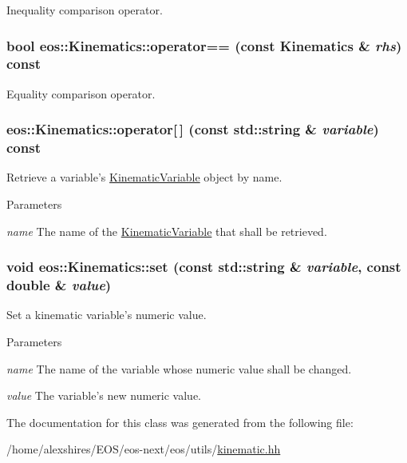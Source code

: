 Inequality comparison operator. \hypertarget{classeos_1_1Kinematics_a7c2edc2b99e1cfd20b71ebd3dcc64d6f}{
\subsubsection[{operator==}]{\setlength{\rightskip}{0pt plus 5cm}bool eos::Kinematics::operator== (const {\bf Kinematics} \& {\em rhs}) const}}
\label{classeos_1_1Kinematics_a7c2edc2b99e1cfd20b71ebd3dcc64d6f}


Equality comparison operator. \hypertarget{classeos_1_1Kinematics_acb41cb59e57011e701785db06164343c}{
\subsubsection[{operator[]}]{ eos::Kinematics::operator\mbox{[}$\,$\mbox{]} (const std::string \& {\em variable}) const}}
\label{classeos_1_1Kinematics_acb41cb59e57011e701785db06164343c}
Retrieve a variable's \hyperlink{classeos_1_1KinematicVariable}{KinematicVariable} object by name.


\begin{DoxyParams}{Parameters}
\item[{\em name}]The name of the \hyperlink{classeos_1_1KinematicVariable}{KinematicVariable} that shall be retrieved. \end{DoxyParams}
\hypertarget{classeos_1_1Kinematics_aeca2fb170ac958269fdc735ddf8bd241}{
\subsubsection[{set}]{\setlength{\rightskip}{0pt plus 5cm}void eos::Kinematics::set (const std::string \& {\em variable}, \/  const double \& {\em value})}}
\label{classeos_1_1Kinematics_aeca2fb170ac958269fdc735ddf8bd241}
Set a kinematic variable's numeric value.


\begin{DoxyParams}{Parameters}
\item[{\em name}]The name of the variable whose numeric value shall be changed. \item[{\em value}]The variable's new numeric value. \end{DoxyParams}


The documentation for this class was generated from the following file:\begin{DoxyCompactItemize}
\item 
/home/alexshires/EOS/eos-\/next/eos/utils/\hyperlink{kinematic_8hh}{kinematic.hh}\end{DoxyCompactItemize}
